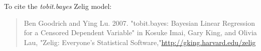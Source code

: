 To cite the \emph{ tobit.bayes } Zelig model:
 \begin{verse}
 Ben Goodrich and Ying Lu. 2007. "tobit.bayes: Bayesian Linear Regression for a Censored Dependent Variable" in Kosuke Imai, Gary King, and Olivia Lau, "Zelig: Everyone's Statistical Software,"\url{http://gking.harvard.edu/zelig} 
\end{verse}